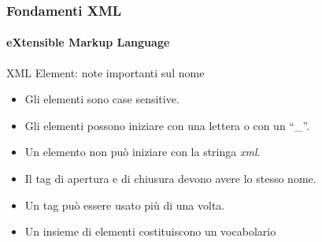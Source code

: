 \begin{frame}
    \frametitle{Fondamenti XML}
    \framesubtitle{eXtensible Markup Language}
    \addtocounter{nframe}{1}

	\begin{block}{XML Element: note importanti sul nome}
		\begin{itemize}
			\item Gli elementi sono case sensitive.
			\item Gli elementi possono iniziare con una lettera o con un ``\_''.
			\item Un elemento non può iniziare con la stringa \textit{xml}. 
			\item Il tag di apertura e di chiusura devono avere lo stesso nome.
			\item Un tag può essere usato più di una volta.
			\item Un insieme di elementi costituiscono un vocabolario
		\end{itemize}
	\end{block}
\end{frame}







